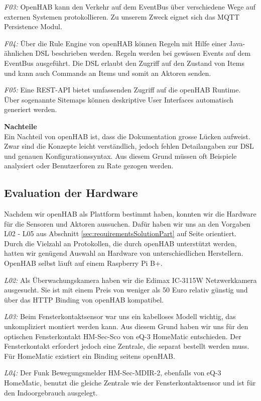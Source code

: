 \textit{F03:} OpenHAB kann den Verkehr auf dem EventBus über verschiedene Wege auf externen Systemen protokollieren. Zu unserem Zweck eignet sich das MQTT Persistence Modul.

\textit{F04:} Über die Rule Engine von openHAB können Regeln mit Hilfe einer Java-ähnlichen DSL beschrieben werden. Regeln werden bei gewissen Events auf dem EventBus ausgeführt. Die DSL erlaubt den Zugriff auf den Zustand von Items und kann auch Commands an Items und somit an Aktoren senden.

\textit{F05:} Eine REST-API bietet umfassenden Zugriff auf die openHAB Runtime. Über sogenannte Sitemaps können deskriptive User Interfaces automatisch generiert werden.



\textbf{Nachteile} \\
Ein Nachteil von openHAB ist, dass die Dokumentation grosse Lücken aufweist. Zwar sind die Konzepte leicht verständlich, jedoch fehlen Detailangaben zur DSL und genauen Konfigurationssyntax. Aus diesem Grund müssen oft Beispiele analysiert oder Benutzerforen zu Rate gezogen werden.

\subsection{Evaluation der Hardware}
Nachdem wir openHAB als Plattform bestimmt haben, konnten wir die Hardware für die Sensoren und Aktoren aussuchen. Dafür haben wir uns an den Vorgaben L02 - L05 aus Abschnitt \ref{sec:requirementsSolutionPart} auf Seite \pageref{sec:requirementsSolutionPart} orientiert. Durch die Vielzahl an Protokollen, die durch openHAB unterstützt werden, hatten wir genügend Auswahl an Hardware von unterschiedlichen Herstellern. OpenHAB selbst läuft auf einem Raspberry Pi B+.

\textit{L02:} Als Überwachungskamera haben wir die Edimax IC-3115W Netzwerkkamera ausgesucht. Sie ist mit einem Preis von weniger als 50 Euro relativ günstig und über das HTTP Binding von openHAB kompatibel.

\textit{L03:} Beim Fensterkontaktsensor war uns ein kabelloses Modell wichtig, das unkompliziert montiert werden kann. Aus diesem Grund haben wir uns für den optischen Fensterkontakt HM-Sec-Sco von eQ-3 HomeMatic entschieden. Der Fensterkontakt erfordert jedoch eine Zentrale, die separat bestellt werden muss. Für HomeMatic existiert ein Binding seitens openHAB.

\textit{L04:} Der Funk Bewegungsmelder HM-Sec-MDIR-2, ebenfalls von eQ-3 HomeMatic, benutzt die gleiche Zentrale wie der Fensterkontaktsensor und ist für den Indoorgebrauch ausgelegt.

